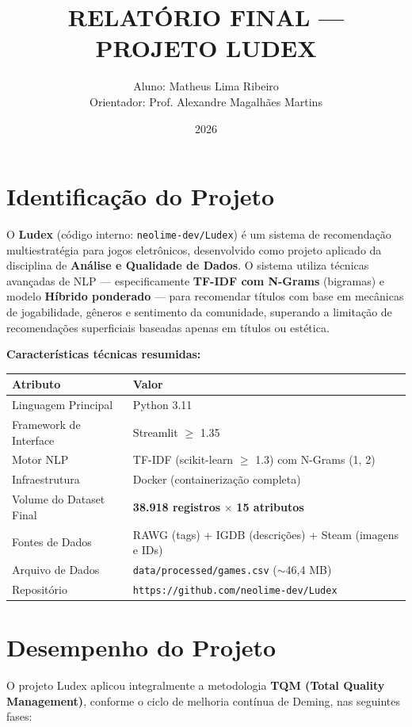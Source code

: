 \documentclass[12pt,a4paper]{article}
\title{RELATÓRIO FINAL --- PROJETO LUDEX}
\author{Aluno: Matheus Lima Ribeiro \\ Orientador: Prof. Alexandre Magalhães Martins}
\date{2026}
\begin{document}
\maketitle
\thispagestyle{empty}

\newpage
\tableofcontents
\newpage

\section{Identificação do Projeto}
O \textbf{Ludex} (código interno: \texttt{neolime-dev/Ludex}) é um sistema de recomendação multiestratégia para jogos eletrônicos, desenvolvido como projeto aplicado da disciplina de \textbf{Análise e Qualidade de Dados}. O sistema utiliza técnicas avançadas de NLP --- especificamente \textbf{TF-IDF com N-Grams} (bigramas) e modelo \textbf{Híbrido ponderado} --- para recomendar títulos com base em mecânicas de jogabilidade, gêneros e sentimento da comunidade, superando a limitação de recomendações superficiais baseadas apenas em títulos ou estética.

\vspace{0.5cm}
\noindent\textbf{Características técnicas resumidas:}

\begin{longtable}{ll}
\toprule
\textbf{Atributo} & \textbf{Valor} \\
\midrule
\endhead
Linguagem Principal & Python 3.11 \\
Framework de Interface & Streamlit $\ge$ 1.35 \\
Motor NLP & TF-IDF (scikit-learn $\ge$ 1.3) com N-Grams (1, 2) \\
Infraestrutura & Docker (containerização completa) \\
Volume do Dataset Final & \textbf{38.918 registros} $\times$ \textbf{15 atributos} \\
Fontes de Dados & RAWG (tags) + IGDB (descrições) + Steam (imagens e IDs) \\
Arquivo de Dados & \texttt{data/processed/games.csv} ($\sim$46,4 MB) \\
Repositório & \texttt{https://github.com/neolime-dev/Ludex} \\
\bottomrule
\end{longtable}

\section{Desempenho do Projeto}
O projeto Ludex aplicou integralmente a metodologia \textbf{TQM (Total Quality Management)}, conforme o ciclo de melhoria contínua de Deming, nas seguintes fases:
\end{document}
